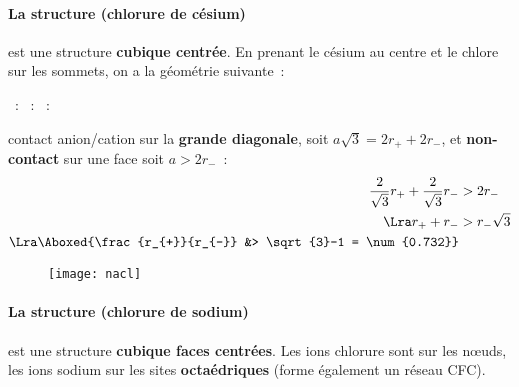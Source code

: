 \documentclass[../main/main.tex]{subfiles}
\begin{document}
\paragraph*{La structure  (chlorure de césium)} est une structure
\textbf{cubique centrée}. En prenant le césium au centre et le chlore sur les
sommets, on a la géométrie suivante~:
\vspace{20pt}
\begin{itemize}[label=$\diamond$]
  ~:
    \vspace{20pt}
  ~:
    \vspace{20pt}
  ~:
  \begin{hide}
    contact anion/cation sur la \textbf{grande
    diagonale}, soit $a \sqrt{3} = 2r_{+} + 2r_{-}$, et
    \textbf{non-contact} sur une face soit $a > 2r_{-}$~:
    \begin{align*}
      \frac{2}{\sqrt{3}}r_{+} + \frac{2}{\sqrt{3}}r_{-} &> 2r_{-}
      \\\Lra
      r_{+} + r_{-} &> r_{-}\sqrt{3}
      \\\Lra
      \Aboxed{\frac{r_{+}}{r_{-}} &> \sqrt{3}-1 = \num{0.732}}
    \end{align*}
\end{hide}
    \vspace{20pt}
\end{itemize}

\begin{wrapfigure}[3]{R}{.3\linewidth}
  \vspace*{-30pt}
  \centering
  \texttt{[image: nacl]}
\end{wrapfigure}
\paragraph*{La structure  (chlorure de sodium)} est une structure
\textbf{cubique faces centrées}. Les ions chlorure sont sur les nœuds, les ions
sodium sur les sites \textbf{octaédriques} (forme également un réseau CFC).
\end{document}
